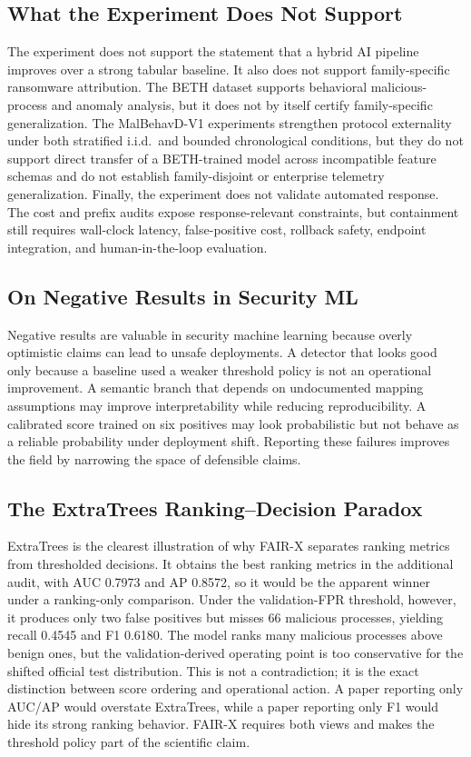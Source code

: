 \documentclass[10pt,journal,compsoc]{IEEEtran}
\begin{document}
\subsection{What the Experiment Does Not Support}

The experiment does not support the statement that a hybrid AI pipeline improves over a strong tabular baseline. It also does not support family-specific ransomware attribution. The BETH dataset supports behavioral malicious-process and anomaly analysis, but it does not by itself certify family-specific generalization. The MalBehavD-V1 experiments strengthen protocol externality under both stratified i.i.d.\ and bounded chronological conditions, but they do not support direct transfer of a BETH-trained model across incompatible feature schemas and do not establish family-disjoint or enterprise telemetry generalization. Finally, the experiment does not validate automated response. The cost and prefix audits expose response-relevant constraints, but containment still requires wall-clock latency, false-positive cost, rollback safety, endpoint integration, and human-in-the-loop evaluation.

\subsection{On Negative Results in Security ML}

Negative results are valuable in security machine learning because overly optimistic claims can lead to unsafe deployments. A detector that looks good only because a baseline used a weaker threshold policy is not an operational improvement. A semantic branch that depends on undocumented mapping assumptions may improve interpretability while reducing reproducibility. A calibrated score trained on six positives may look probabilistic but not behave as a reliable probability under deployment shift. Reporting these failures improves the field by narrowing the space of defensible claims.

\subsection{The ExtraTrees Ranking--Decision Paradox}

ExtraTrees is the clearest illustration of why FAIR-X separates ranking metrics from thresholded decisions. It obtains the best ranking metrics in the additional audit, with AUC 0.7973 and AP 0.8572, so it would be the apparent winner under a ranking-only comparison. Under the validation-FPR threshold, however, it produces only two false positives but misses 66 malicious processes, yielding recall 0.4545 and F1 0.6180. The model ranks many malicious processes above benign ones, but the validation-derived operating point is too conservative for the shifted official test distribution. This is not a contradiction; it is the exact distinction between score ordering and operational action. A paper reporting only AUC/AP would overstate ExtraTrees, while a paper reporting only F1 would hide its strong ranking behavior. FAIR-X requires both views and makes the threshold policy part of the scientific claim.
\end{document}
